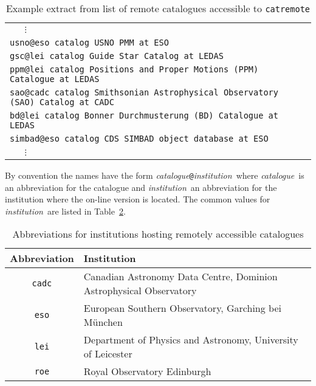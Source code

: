 \documentclass[twoside,11pt]{starlink}
\begin{document}
\begin{table}[htbp]

\begin{center}
\begin{tabular}{l}
\texttt{~~~$\vdots$ } \\
\texttt{usno@eso  catalog  USNO PMM at ESO} \\
\texttt{gsc@lei  catalog  Guide Star Catalog at LEDAS} \\
\texttt{ppm@lei  catalog  Positions and Proper Motions (PPM) Catalogue at LEDAS} \\
\texttt{sao@cadc  catalog  Smithsonian Astrophysical Observatory (SAO) Catalog at CADC} \\
\texttt{bd@lei  catalog  Bonner Durchmusterung (BD) Catalogue at LEDAS} \\
\texttt{simbad@eso  catalog  CDS SIMBAD object database at ESO} \\
\texttt{~~~$\vdots$ } \\
\end{tabular}
\end{center}

\begin{quote}
\caption{Example extract from list of remote catalogues accessible to
\texttt{catremote} \label{REMLIST} }
\end{quote}

\end{table}

By convention the names have the form \textit{catalogue}\texttt{@}\textit{institution}\, where \textit{catalogue}\, is an abbreviation for the
catalogue and \textit{institution}\, an abbreviation for the institution
where the on-line version is located.  The common values for \textit{institution}\, are listed in Table~\ref{REMINST}.

\begin{table}[htbp]

\begin{center}
\begin{tabular}{cl}
Abbreviation  &  Institution  \\ \hline
\texttt{cadc} & Canadian Astronomy Data Centre, Dominion Astrophysical
    Observatory  \\
\texttt{eso} &  European Southern Observatory, Garching bei M\"{u}nchen \\
\texttt{lei} &  Department of Physics and Astronomy, University of Leicester \\
\texttt{roe} &  Royal Observatory Edinburgh \\
\end{tabular}
\end{center}

\caption{Abbreviations for institutions hosting remotely accessible
catalogues  \label{REMINST} }

\end{table}
\end{document}
